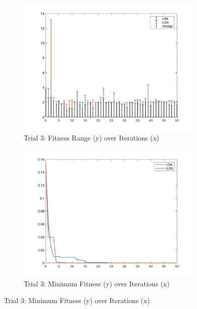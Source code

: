 \begin{figure}
  \begin{subfigure}[b]{0.4\textwidth}
    \includegraphics[width=\textwidth]{img/bars/f1/3}
    \caption{ \scriptsize Trial 3: Fitness Range (y) over Iterations (x)}
    \label{fig:f1-b-3}
  \end{subfigure}
  \begin{subfigure}[b]{0.4\textwidth}
    \includegraphics[width=\textwidth]{img/fits/f1/3}
    \caption{ \scriptsize Trial 3: Minimum Fitness (y) over Iterations (x)}
    \label{fig:f1-f-3}
  \end{subfigure}


\end{figure}
